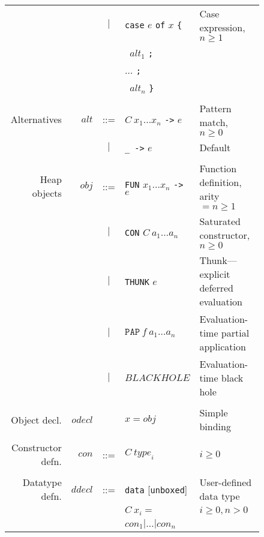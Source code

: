 \documentclass{llncs}
\begin{document}
\begin{figure}
\begin{tabular}{r r c l l}
             &                & $|$ & \texttt{case} $e$ \texttt{of} $x$ \texttt{\{}  & Case expression, $n \ge 1$\\
             &                &     & \texttt{ } $\mathit{alt}_1$ \texttt{;} \\
             &                &     & \hspace{0.2in} $\dots$ \texttt{;} \\
             &                &     & \texttt{ } $\mathit{alt}_n$ \texttt{\}} \\
\\
Alternatives & $\mathit{alt}$ & ::= & $C\ x_1\dots x_n$ \texttt{->} $e$            & Pattern match, $n \ge 0$ \\
             &                & $|$ & \texttt{\_ ->} $e$                           & Default \\
\\
Heap objects & $\mathit{obj}$ & ::= &\texttt{FUN} $x_1\dots x_n$ \texttt{->} $e$   & Function definition, arity $=n\ge 1$ \\
             &                & $|$ &\texttt{CON} $C\ a_1\dots a_n$                & Saturated constructor, $n \ge 0$ \\
             &                & $|$ &\texttt{THUNK} $e$                            & Thunk---explicit deferred evaluation \\
             &                & $|$ & $\texttt{PAP}\ f\ a_1\dots a_n$               & Evaluation-time partial application \\
             &                & $|$ & $\mathit{BLACKHOLE}$                         & Evaluation-time black hole \\
\\
Object decl. & $\mathit{odecl}$ &     & $x = \mathit{obj}$                           & Simple binding \\
\\
Constructor defn. & $\mathit{con}$  & ::= & $C\ \mathit{type}_i$ & $i \ge 0$ \\
\\
Datatype defn. &  $\mathit{ddecl}$ & ::= & \texttt{data} [\texttt{unboxed}] & User-defined data type  \\
               &                   &     & $C\ x_i =$                       & $i \ge 0, n > 0$         \\
               &                   &     & $\mathit{con}_1 | \dots |  \mathit{con}_n$ \\


\end{tabular}
\end{figure}
\end{document}
